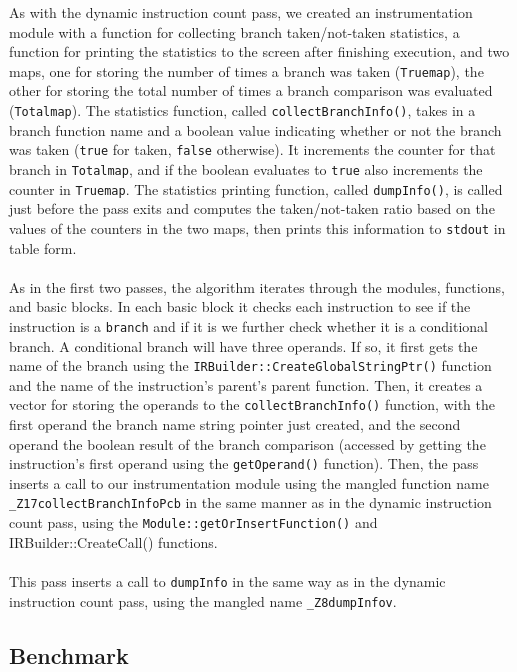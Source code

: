 \documentclass[12pt]{article}
\begin{document}
As with the dynamic instruction count pass, we created an instrumentation module with a function for collecting branch taken/not-taken statistics, a function for printing the statistics to the screen after finishing execution, and two maps, one for storing the number of times a branch was taken ({\tt Truemap}), the other for storing the total number of times a branch comparison was evaluated ({\tt Totalmap}). The statistics function, called {\tt collectBranchInfo()}, takes in a branch function name and a boolean value indicating whether or not the branch was taken ({\tt true} for taken, {\tt false} otherwise). It increments the counter for that branch in {\tt Totalmap}, and if the boolean evaluates to {\tt true} also increments the counter in {\tt Truemap}. The statistics printing function, called {\tt dumpInfo()}, is called just before the pass exits and computes the taken/not-taken ratio based on the values of the counters in the two maps, then prints this information to {\tt stdout} in table form.
\\\\
As in the first two passes, the algorithm iterates through the modules, functions, and basic blocks. In each basic block it checks each instruction to see if the instruction is a {\tt branch} and if it is we further check whether it is a conditional branch. A conditional branch will have three operands. If so, it first gets the name of the branch using the {\tt IRBuilder::CreateGlobalStringPtr()} function and the name of the instruction's parent's parent function. Then, it creates a vector for storing the operands to the {\tt collectBranchInfo()} function, with the first operand the branch name string pointer just created, and the second operand the boolean result of the branch comparison (accessed by getting the instruction's first operand using the {\tt getOperand()} function). Then, the pass inserts a call to our instrumentation module using the mangled function name {\tt \_Z17collectBranchInfoPcb} in the same manner as in the dynamic instruction count pass, using the {\tt Module::getOrInsertFunction()} and {IRBuilder::CreateCall()} functions.
\\\\
This pass inserts a call to {\tt dumpInfo} in the same way as in the dynamic instruction count pass, using the mangled name {\tt \_Z8dumpInfov}.


\subsection{Benchmark}
\end{document}
